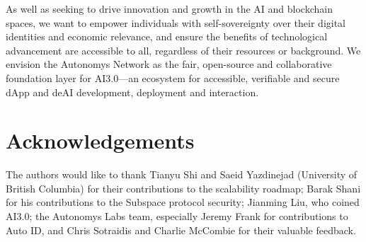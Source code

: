 \documentclass[conference]{IEEEtran}
\begin{document}
As well as seeking to drive innovation and growth in the AI and blockchain spaces, we want to empower individuals with self-sovereignty over their digital identities and economic relevance, and ensure the benefits of technological advancement are accessible to all, regardless of their resources or background. We envision the Autonomys Network as the fair, open-source and collaborative foundation layer for AI3.0—an ecosystem for accessible, verifiable and secure dApp and deAI development, deployment and interaction.

\section*{Acknowledgements}
The authors would like to thank Tianyu Shi and Saeid Yazdinejad (University of British Columbia) for their contributions to the scalability roadmap; Barak Shani for his contributions to the Subspace protocol security; Jianming Liu, who coined AI3.0; the Autonomys Labs team, especially Jeremy Frank for contributions to Auto ID, and Chris Sotraidis and Charlie McCombie for their valuable feedback.
\end{document}
